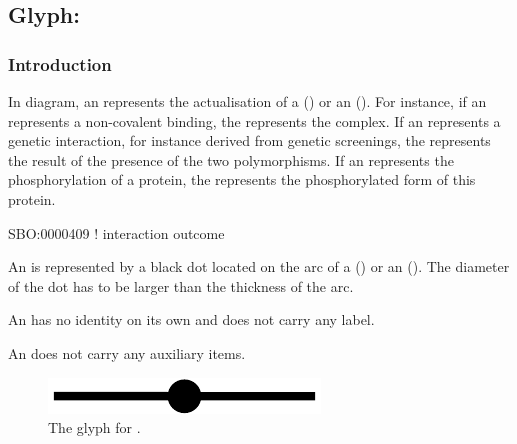 
\color{green}
\subsection{Glyph: }\label{sec:outcome}

\subsubsection{Introduction}

In \ER diagram, an  represents the actualisation of a  () or an  (). For instance, if an  represents a non-covalent binding, the  represents the complex. If an  represents a genetic interaction, for instance derived from genetic screenings, the  represents the result of the presence of the two polymorphisms. If an  represents the phosphorylation of a protein, the  represents the phosphorylated form of this protein.

\begin{glyphDescription}

\glyphSboTerm SBO:0000409 ! interaction outcome

\glyphContainer  An  is represented by a black dot located on the arc of a  () or an  (). The diameter of the dot has to be larger than the thickness of the arc.

\glyphLabel An  has no identity on its own and does not carry any label. 

\glyphAux An  does not carry any auxiliary items.

\end{glyphDescription}

\begin{figure}[H]
  \centering
  \includegraphics[scale = 0.3]{images/outcome}
  \caption{The \ER glyph for .}
  \label{fig:outcome}
\end{figure}

\normalcolor
	
